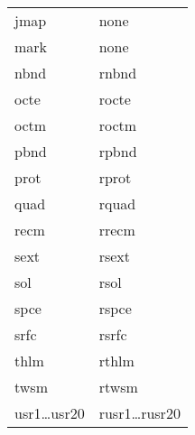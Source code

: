 \begin{center}
\begin{tabular}{ll}
\hspace{4em}jmap                 &\hspace{3em}none  \\
\hspace{4em}mark                 &\hspace{3em}none  \\
\hspace{4em}nbnd                 &\hspace{3em}rnbnd \\
\hspace{4em}octe                 &\hspace{3em}rocte \\
\hspace{4em}octm                 &\hspace{3em}roctm \\
\hspace{4em}pbnd                 &\hspace{3em}rpbnd \\
\hspace{4em}prot                 &\hspace{3em}rprot \\
\hspace{4em}quad                 &\hspace{3em}rquad \\
\hspace{4em}recm                 &\hspace{3em}rrecm \\
\hspace{4em}sext                 &\hspace{3em}rsext \\
\hspace{4em}sol                  &\hspace{3em}rsol  \\
\hspace{4em}spce                 &\hspace{3em}rspce \\
\hspace{4em}srfc                 &\hspace{3em}rsrfc \\
\hspace{4em}thlm                 &\hspace{3em}rthlm \\
\hspace{4em}twsm                 &\hspace{3em}rtwsm \\
\hspace{2.5em}usr1\ldots  usr20     &\hspace{1.5em}rusr1\ldots rusr20
\end{tabular}
\end{center}
\vspace{5mm}

